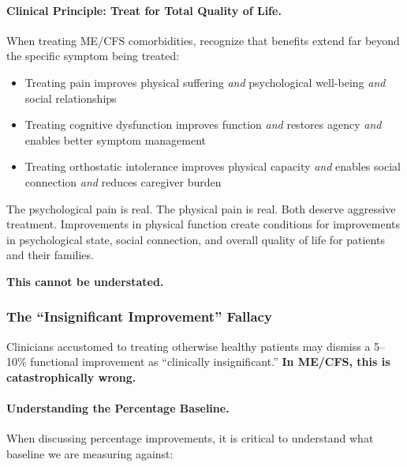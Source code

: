 \paragraph{Clinical Principle: Treat for Total Quality of Life.}

When treating ME/CFS comorbidities, recognize that benefits extend far beyond the specific symptom being treated:

\begin{itemize}
    \item Treating pain improves physical suffering \textit{and} psychological well-being \textit{and} social relationships
    \item Treating cognitive dysfunction improves function \textit{and} restores agency \textit{and} enables better symptom management
    \item Treating orthostatic intolerance improves physical capacity \textit{and} enables social connection \textit{and} reduces caregiver burden
\end{itemize}

The psychological pain is real. The physical pain is real. Both deserve aggressive treatment. Improvements in physical function create conditions for improvements in psychological state, social connection, and overall quality of life for patients and their families.

\textbf{This cannot be understated.}

\subsubsection{The ``Insignificant Improvement'' Fallacy}

Clinicians accustomed to treating otherwise healthy patients may dismiss a 5--10\% functional improvement as ``clinically insignificant.'' \textbf{In ME/CFS, this is catastrophically wrong.}

\paragraph{Understanding the Percentage Baseline.}
When discussing percentage improvements, it is critical to understand what baseline we are measuring against:

